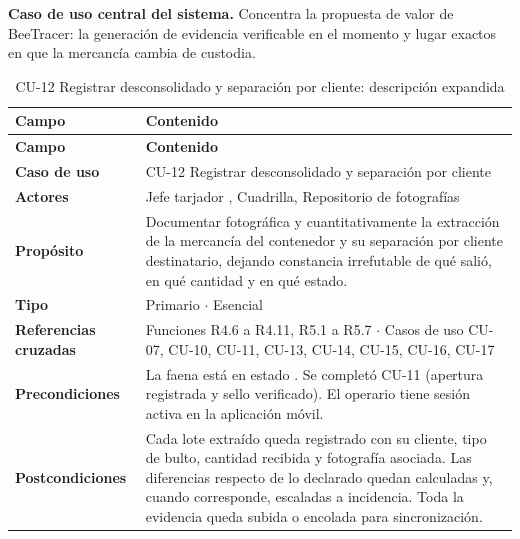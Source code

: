 \begin{nota}
\textbf{Caso de uso central del sistema.} Concentra la propuesta de valor de BeeTracer: la
generación de evidencia verificable en el momento y lugar exactos en que la mercancía cambia de
custodia.
\end{nota}

{\estilotabla
\begin{longtable}{L{0.25\textwidth} L{0.69\textwidth}}

\caption{CU-12 Registrar desconsolidado y separación por cliente: descripción expandida}
\label{tab:cu12_desc}
\\

\toprule
\textbf{Campo} & \textbf{Contenido} \\
\midrule
\endfirsthead

\toprule
\textbf{Campo} & \textbf{Contenido} \\
\midrule
\endhead

\textbf{Caso de uso} & CU-12 Registrar desconsolidado y separación por cliente \\
\midrule
\textbf{Actores} & Jefe tarjador , Cuadrilla, Repositorio de fotografías
 \\
\midrule
\textbf{Propósito} & Documentar fotográfica y cuantitativamente la extracción de la mercancía del
contenedor y su separación por cliente destinatario, dejando constancia irrefutable de qué salió,
en qué cantidad y en qué estado. \\
\midrule
\textbf{Tipo} & Primario $\cdot$ Esencial \\
\midrule
\textbf{Referencias cruzadas} & Funciones R4.6 a R4.11, R5.1 a R5.7 $\cdot$ Casos de uso CU-07,
CU-10, CU-11, CU-13, CU-14, CU-15, CU-16, CU-17 \\
\midrule
\textbf{Precondiciones} & La faena está en estado . Se completó CU-11
(apertura registrada y sello verificado). El operario tiene sesión activa en la aplicación
móvil. \\
\midrule
\textbf{Postcondiciones} & Cada lote extraído queda registrado con su cliente, tipo de bulto,
cantidad recibida y fotografía asociada. Las diferencias respecto de lo declarado quedan calculadas
y, cuando corresponde, escaladas a incidencia. Toda la evidencia queda subida o encolada para
sincronización. \\

\bottomrule

\end{longtable}
}

